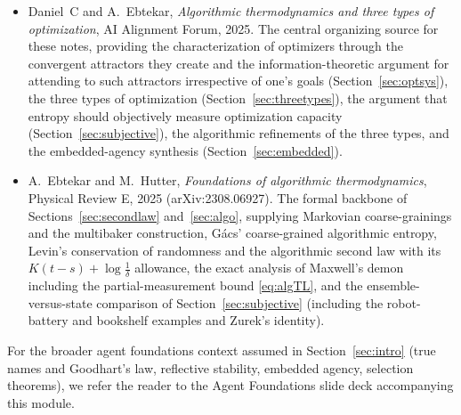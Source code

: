 \documentclass[11pt]{article}
\begin{document}
\begin{itemize}[leftmargin=2em]
  \item Daniel~C and A.~Ebtekar, \emph{Algorithmic thermodynamics and three types of optimization}, AI Alignment Forum, 2025. The central organizing source for these notes, providing the characterization of optimizers through the convergent attractors they create and the information-theoretic argument for attending to such attractors irrespective of one's goals (Section~\ref{sec:optsys}), the three types of optimization (Section~\ref{sec:threetypes}), the argument that entropy should objectively measure optimization capacity (Section~\ref{sec:subjective}), the algorithmic refinements of the three types, and the embedded-agency synthesis (Section~\ref{sec:embedded}).
  \item A.~Ebtekar and M.~Hutter, \emph{Foundations of algorithmic thermodynamics}, Physical Review E, 2025 (arXiv:2308.06927). The formal backbone of Sections~\ref{sec:secondlaw} and~\ref{sec:algo}, supplying Markovian coarse-grainings and the multibaker construction, G\'acs' coarse-grained algorithmic entropy, Levin's conservation of randomness and the algorithmic second law with its $K(t-s) + \log\frac1\delta$ allowance, the exact analysis of Maxwell's demon including the partial-measurement bound \eqref{eq:algTL}, and the ensemble-versus-state comparison of Section~\ref{sec:subjective} (including the robot-battery and bookshelf examples and Zurek's identity).
\end{itemize}

For the broader agent foundations context assumed in Section~\ref{sec:intro} (true names and Goodhart's law, reflective stability, embedded agency, selection theorems), we refer the reader to the Agent Foundations slide deck accompanying this module.
\end{document}
